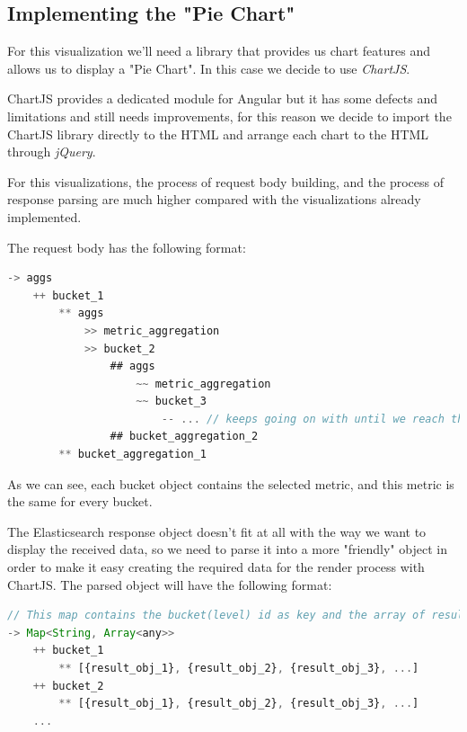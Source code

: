\documentclass[a4paper, 12pt, english]{book}
\begin{document}
\subsection{Implementing the "Pie Chart"}
\label{sec:pie-chart}
For this visualization we'll need a library that provides us chart features and allows us to display a "Pie Chart". In this case we decide to use \textit{ChartJS}.

ChartJS provides a dedicated module for Angular but it has some defects and limitations and still needs improvements, for this reason we decide to import the ChartJS library directly to the HTML and arrange each chart to the HTML through \textit{jQuery}.

For this visualizations, the process of request body building, and the process of response parsing are much higher compared with the visualizations already implemented.

The request body has the following format:
\begin{lstlisting}[language=javascript]
-> aggs
    ++ bucket_1
        ** aggs
            >> metric_aggregation
            >> bucket_2
                ## aggs
                    ~~ metric_aggregation
                    ~~ bucket_3
                        -- ... // keeps going on with until we reach the desired number of levels
                ## bucket_aggregation_2
        ** bucket_aggregation_1
\end{lstlisting}

As we can see, each bucket object contains the selected metric, and this metric is the same for every bucket.

The Elasticsearch response object doesn't fit at all with the way we want to display the received data, so we need to parse it into a more "friendly" object in order to make it easy creating the required data for the render process with ChartJS. The parsed object will have the following format:
\begin{lstlisting}[language=javascript, caption=Custom results object, label=code:cutom-pie-chart-obj]
// This map contains the bucket(level) id as key and the array of results as value.
-> Map<String, Array<any>>
    ++ bucket_1
        ** [{result_obj_1}, {result_obj_2}, {result_obj_3}, ...]
    ++ bucket_2
        ** [{result_obj_1}, {result_obj_2}, {result_obj_3}, ...]
    ...

\end{lstlisting}
\end{document}
